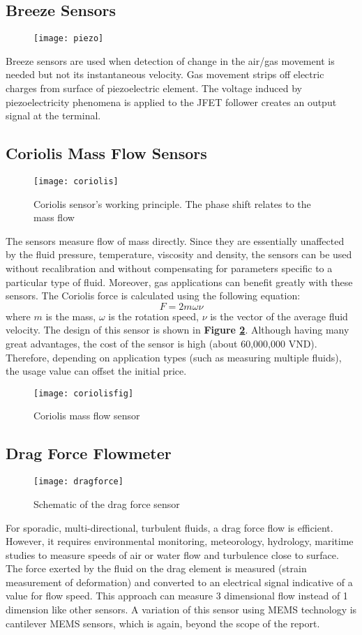 \subsection{Breeze Sensors}
\begin{figure}[ht]
\centering
\texttt{[image: piezo]}
\label{piezo}
\end{figure}
Breeze sensors are used when detection of change in the air/gas movement is needed but not its instantaneous velocity. Gas movement strips off electric charges from surface of piezoelectric element. The voltage induced by piezoelectricity phenomena is applied to the JFET follower creates an output signal at the terminal.

\subsection{Coriolis Mass Flow Sensors}
\begin{figure}[ht]
	\centering
	\texttt{[image: coriolis]}
	\caption{Coriolis sensor's working principle. The phase shift relates to the mass flow}
	\label{coriolis}
\end{figure}
The sensors measure flow of mass directly. Since they are essentially unaffected by the fluid pressure, temperature, viscosity and density, the sensors can be used without recalibration and without compensating for parameters specific to a particular type of fluid. Moreover, gas applications can benefit greatly with these sensors. The Coriolis force is calculated using the following equation:
\[
F = 2m\omega \nu
\]
where $ m $ is the mass, $ \omega $ is the rotation speed, $ \nu $ is the vector of the average fluid velocity. The design of this sensor is shown in \textbf{Figure \ref{coriolis}}. Although having many great advantages, the cost of the sensor is high (about 60,000,000 VND). Therefore, depending on application types (such as measuring multiple fluids), the usage value can offset the initial price.
\begin{figure}[ht]
	\centering
	\texttt{[image: coriolisfig]}
	\caption{Coriolis mass flow sensor}
	\label{coriolisfig}
\end{figure}

\subsection{Drag Force Flowmeter}
\begin{figure}[ht]
	\centering
	\texttt{[image: dragforce]}
	\caption{Schematic of the drag force sensor}
	\label{drag}
\end{figure}
For sporadic, multi-directional, turbulent fluids, a drag force flow is efficient. However, it requires environmental monitoring, meteorology, hydrology, maritime studies to measure speeds of air or water flow and turbulence close to surface. The force exerted by the fluid on the drag element is measured (strain measurement of deformation) and converted to an electrical signal indicative of a value for flow speed. This approach can measure 3 dimensional flow instead of 1 dimension like other sensors. A variation of this sensor using MEMS technology is cantilever MEMS sensors, which is again, beyond the scope of the report.

